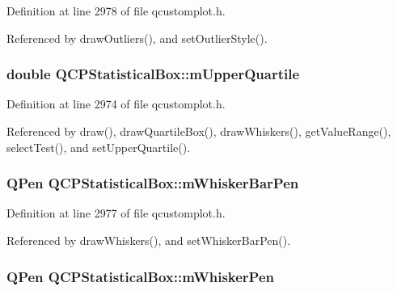 Definition at line 2978 of file qcustomplot.\+h.



Referenced by draw\+Outliers(), and set\+Outlier\+Style().

\hypertarget{class_q_c_p_statistical_box_a865afbcca332ee851aa45807381bc80e}{}
\subsubsection[{m\+Upper\+Quartile}]{\setlength{\rightskip}{0pt plus 5cm}double Q\+C\+P\+Statistical\+Box\+::m\+Upper\+Quartile\hspace{0.3cm}{\ttfamily [protected]}}\label{class_q_c_p_statistical_box_a865afbcca332ee851aa45807381bc80e}


Definition at line 2974 of file qcustomplot.\+h.



Referenced by draw(), draw\+Quartile\+Box(), draw\+Whiskers(), get\+Value\+Range(), select\+Test(), and set\+Upper\+Quartile().

\hypertarget{class_q_c_p_statistical_box_aa719b1d722a9f82364df1497a6dc1da8}{}
\subsubsection[{m\+Whisker\+Bar\+Pen}]{\setlength{\rightskip}{0pt plus 5cm}Q\+Pen Q\+C\+P\+Statistical\+Box\+::m\+Whisker\+Bar\+Pen\hspace{0.3cm}{\ttfamily [protected]}}\label{class_q_c_p_statistical_box_aa719b1d722a9f82364df1497a6dc1da8}


Definition at line 2977 of file qcustomplot.\+h.



Referenced by draw\+Whiskers(), and set\+Whisker\+Bar\+Pen().

\hypertarget{class_q_c_p_statistical_box_a25b7552499f0f090fcff02858b2265a5}{}
\subsubsection[{m\+Whisker\+Pen}]{\setlength{\rightskip}{0pt plus 5cm}Q\+Pen Q\+C\+P\+Statistical\+Box\+::m\+Whisker\+Pen\hspace{0.3cm}{\ttfamily [protected]}}\label{class_q_c_p_statistical_box_a25b7552499f0f090fcff02858b2265a5}


